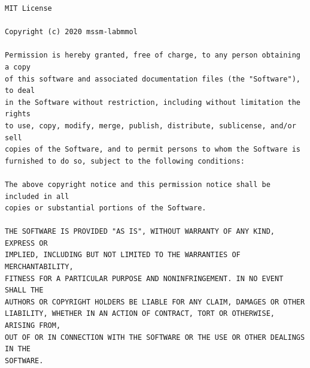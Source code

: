 \documentclass[10pt,a4paper,openany]{memoir}
\numberwithin{equation}{section}
\begin{document}
\begin{verbatim}
MIT License

Copyright (c) 2020 mssm-labmmol

Permission is hereby granted, free of charge, to any person obtaining a copy
of this software and associated documentation files (the "Software"), to deal
in the Software without restriction, including without limitation the rights
to use, copy, modify, merge, publish, distribute, sublicense, and/or sell
copies of the Software, and to permit persons to whom the Software is
furnished to do so, subject to the following conditions:

The above copyright notice and this permission notice shall be included in all
copies or substantial portions of the Software.

THE SOFTWARE IS PROVIDED "AS IS", WITHOUT WARRANTY OF ANY KIND, EXPRESS OR
IMPLIED, INCLUDING BUT NOT LIMITED TO THE WARRANTIES OF MERCHANTABILITY,
FITNESS FOR A PARTICULAR PURPOSE AND NONINFRINGEMENT. IN NO EVENT SHALL THE
AUTHORS OR COPYRIGHT HOLDERS BE LIABLE FOR ANY CLAIM, DAMAGES OR OTHER
LIABILITY, WHETHER IN AN ACTION OF CONTRACT, TORT OR OTHERWISE, ARISING FROM,
OUT OF OR IN CONNECTION WITH THE SOFTWARE OR THE USE OR OTHER DEALINGS IN THE
SOFTWARE.
\end{verbatim}
\end{document}
